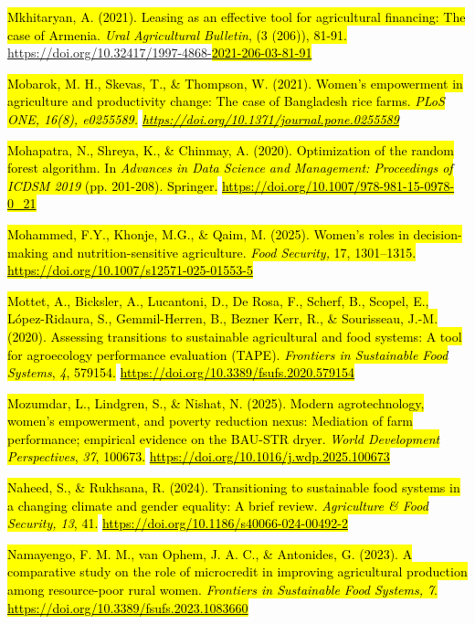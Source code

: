 \documentclass[
]{article}
\begin{document}
\hl{Mkhitaryan, A. (2021). Leasing as an effective tool for agricultural
financing: The case of Armenia. \emph{Ural Agricultural Bulletin}, (3
(206)), 81-91.}
\href{https://doi.org/10.32417/1997-4868-2021-206-03-81-91}{\hl{}https://doi.org/10.32417/1997-4868-\hl{2021-206-03-81-91}}

\hl{Mobarok, M. H., Skevas, T., \& Thompson, W. (2021). Women's
empowerment in agriculture and productivity change: The case of
Bangladesh rice farms. \emph{PLoS ONE, 16(8), e0255589.}}
\href{https://doi.org/10.1371/journal.pone.0255589}{\emph{\hl{https://doi.org/10.1371/journal.pone.0255589}}}

\hl{Mohapatra, N., Shreya, K., \& Chinmay, A. (2020). Optimization of
the random forest algorithm. In \emph{Advances in Data Science and
Management: Proceedings of ICDSM 2019} (pp. 201-208). Springer.}
\href{https://doi.org/10.1007/978-981-15-0978-0_21}{\hl{https://doi.org/10.1007/978-981-15-0978-0\_21}}

\hl{Mohammed, F.Y., Khonje, M.G., \& Qaim, M. (2025). Women's roles in
decision-making and nutrition-sensitive agriculture. \emph{Food
Security,} 17, 1301--1315.}
\href{https://doi.org/10.1007/s12571-025-01553-5}{\hl{https://doi.org/10.1007/s12571-025-01553-5}}

\hl{Mottet, A., Bicksler, A., Lucantoni, D., De Rosa, F., Scherf, B.,
Scopel, E., López-Ridaura, S., Gemmil-Herren, B., Bezner Kerr, R., \&
Sourisseau, J.-M. (2020). Assessing transitions to sustainable
agricultural and food systems: A tool for agroecology performance
evaluation (TAPE). \emph{Frontiers in Sustainable Food Systems},
\emph{4}, 579154.}
\href{https://doi.org/10.3389/fsufs.2020.579154}{\hl{https://doi.org/10.3389/fsufs.2020.579154}}

\hl{Mozumdar, L., Lindgren, S., \& Nishat, N. (2025). Modern
agrotechnology, women's empowerment, and poverty reduction nexus:
Mediation of farm performance; empirical evidence on the BAU-STR dryer.
\emph{World Development Perspectives}, \emph{37}, 100673.}
\href{https://doi.org/10.1016/j.wdp.2025.100673}{\hl{https://doi.org/10.1016/j.wdp.2025.100673}}

\hl{Naheed, S., \& Rukhsana, R. (2024). Transitioning to sustainable
food systems in a changing climate and gender equality: A brief review.
\emph{Agriculture \& Food Security, 13}, 41.}
\href{https://doi.org/10.1186/s40066-024-00492-2}{\hl{https://doi.org/10.1186/s40066-024-00492-2}}

\hl{Namayengo, F. M. M., van Ophem, J. A. C., \& Antonides, G. (2023). A
comparative study on the role of microcredit in improving agricultural
production among resource-poor rural women. \emph{Frontiers in
Sustainable Food Systems, 7}.}
\href{https://doi.org/10.3389/fsufs.2023.1083660}{\hl{https://doi.org/10.3389/fsufs.2023.1083660}}
\end{document}
